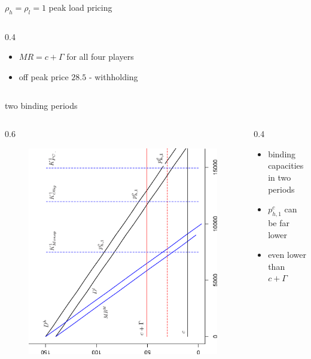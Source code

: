 \begin{frame} {$\rho_h = \rho_l = 1$ peak load pricing}
\begin{columns}
\begin{column} {0.4\textwidth}
\begin{itemize}
\begin{itemize}
	 \item $MR = c+ \Gamma$ for all four players
	 \item off peak price $28.5$ - withholding
\end{itemize}
\end{itemize}
\end{column}
\end{columns}

\end{frame}


\begin{frame} {two binding periods}					
\begin{columns}
\begin{column} {0.6\textwidth}
\begin{figure}[h]
\centering
\includegraphics[width=1.0\textwidth,angle=270]{22}
    \label{fig:1}            
\end{figure}
\end{column}

\begin{column} {0.4\textwidth}

\begin{itemize}
	\item binding capacities in two periods
	\item $p^c_{h,1}$ can be far lower
	\item even lower than $c+\Gamma$
\end{itemize}

\end{column}
\end{columns}

\end{frame}

